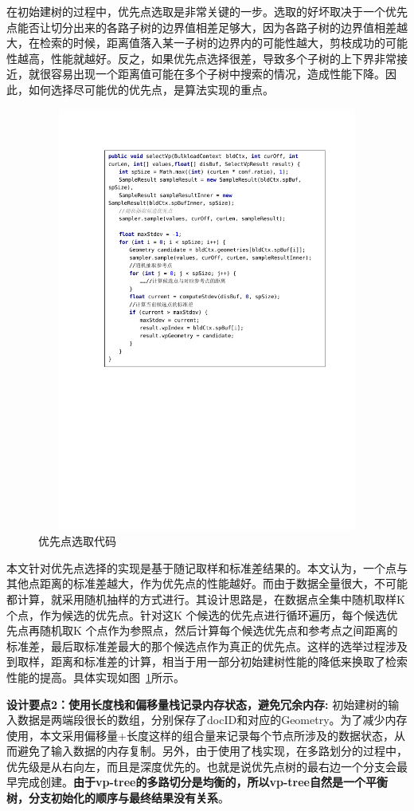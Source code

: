 在初始建树的过程中，优先点选取是非常关键的一步。选取的好坏取决于一个优先点能否让切分出来的各路子树的边界值相差足够大，因为各路子树的边界值相差越大，在检索的时候，距离值落入某一子树的边界内的可能性越大，剪枝成功的可能性越高，性能就越好。反之，如果优先点选择很差，导致多个子树的上下界非常接近，就很容易出现一个距离值可能在多个子树中搜索的情况，造成性能下降。因此，如何选择尽可能优的优先点，是算法实现的重点。
\begin{figure}[H]
  \centering
  \includegraphics[width=6in,height=5.5in]{new_FIGs/chapter4/select-vp-code.pdf}
  \caption{优先点选取代码}\label{select-vp-code}
\end{figure}
本文针对优先点选择的实现是基于随记取样和标准差结果的。本文认为，一个点与其他点距离的标准差越大，作为优先点的性能越好。而由于数据全量很大，不可能都计算，就采用随机抽样的方式进行。其设计思路是，在数据点全集中随机取样K 个点，作为候选的优先点。针对这K 个候选的优先点进行循环遍历，每个候选优先点再随机取K 个点作为参照点，然后计算每个候选优先点和参考点之间距离的标准差，最后取标准差最大的那个候选点作为真正的优先点。这样的选举过程涉及到取样，距离和标准差的计算，相当于用一部分初始建树性能的降低来换取了检索性能的提高。具体实现如图~\ref{select-vp-code}所示。

\textbf{设计要点2：使用长度栈和偏移量栈记录内存状态，避免冗余内存:}
初始建树的输入数据是两端段很长的数组，分别保存了docID和对应的Geometry。为了减少内存使用，本文采用偏移量+长度这样的组合量来记录每个节点所涉及的数据状态，从而避免了输入数据的内存复制。另外，由于使用了栈实现，在多路划分的过程中，优先级是从右向左，而且是深度优先的。也就是说优先点树的最右边一个分支会最早完成创建。\textbf{由于vp-tree的多路切分是均衡的，所以vp-tree自然是一个平衡树，分支初始化的顺序与最终结果没有关系}。

